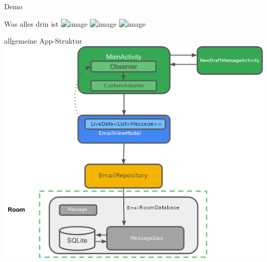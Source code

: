 \documentclass[aspectratio=169]{beamer}
\begin{document}
\begin{frame}{Demo}
\end{frame}

\begin{frame}{Was alles drin ist}
\includegraphics<1>[height=.8\textheight]{media/emailViewer.jpg}
\pause
\includegraphics<2>[height=.8\textheight]{media/emailWriter.jpg}
\pause
\includegraphics<3>[height=.8\textheight]{media/accountManager.jpg}
\end{frame}

\begin{frame}{allgemeine App-Struktur}
\centering
\includegraphics[height=.7\textheight]{../maturText/media/AppStructure.png}
\end{frame}
\end{document}
